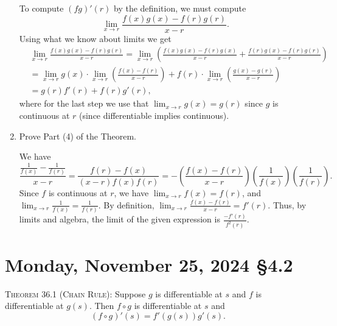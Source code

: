 \documentclass[12pt]{amsart}
\def\Mo{Monday}
\numberwithin{equation}{section}
\theoremstyle{plain} %
\newcommand{\Nov}[3]{\section{#2, November #1, 2024 \quad \S#3}}
\theoremstyle{definition}
\theoremstyle{remark}
\begin{document}
\begin{enumerate}
 \begin{framed} To compute $(fg)'(r)$ by the definition, we must compute
 \[ \lim_{x \to r} \frac{f(x)g(x) - f(r)g(r)}{x-r}.\]
Using what we know about limits we get 
$$
\begin{aligned}
& \lim_{x \to r} \frac{f(x)g(x) - f(r)g(r)}{x-r} 
=  \lim_{x \to r} \left(\frac{f(x)g(x) - f(r)g(x)}{x-r}  + \frac{f(r)g(x) -     f(r)g(r)}{x-r} \right) \\
& =  \lim_{x \to r} g(x) \cdot \lim_{x \to r}\left(\frac{f(x) - f(r)}{x-r}\right)  
+ f(r) \cdot \lim_{x \to r} \left(\frac{g(x) -     g(r)}{x-r} \right)  \\
&= g(r) f'(r) + f(r) g'(r),
\end{aligned}
$$
where for the last step we use that $\lim_{x \to r} g(x) = g(r)$ since $g$ is continuous at $r$ (since differentiable implies continuous).
\end{framed}
 \item Prove Part (4) of the Theorem.
 
 \begin{framed}
We have
\[ \frac{\frac{1}{f(x)} - \frac{1}{f(r)}}{x-r} =  \frac{f(r) - f(x)}{(x-r) f(x) f(r)} = -\left(\frac{f(x) - f(r)}{x-r}
\right) \left(\frac{1}{f(x)} \right)\left(\frac{1}{f(r)}\right).\]
Since $f$ is continuous at $r$, we have $\lim_{x\to r} f(x) = f(r)$, and $\lim_{x\to r} \frac{1}{f(x)} = \frac{1}{f(r)}$. By definition, $\lim_{x\to r} \frac{f(x) - f(r)}{x-r} = f'(r)$. Thus, by limits and algebra, the limit of the given expression is $\frac{-f'(r)}{f^2(r)}$.
\end{framed}

\end{enumerate}

\newpage

\Nov{25}{\Mo}{4.2}

\begin{framed} 


 \noindent \textsc{Theorem 36.1 (Chain Rule):}   
  Suppose $g$ is differentiable at $s$ and $f$ is
  differentiable  at $g(s)$. Then $f \circ g$ is differentiable at $s$ and
$$
(f \circ g)'(s) = f'(g(s)) g'(s).
$$


 \end{framed}


\
\end{document}
